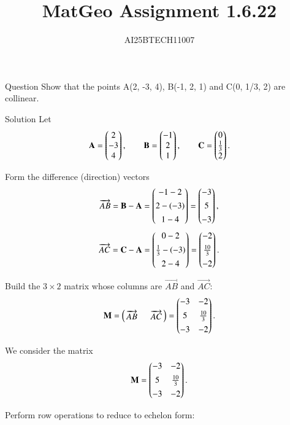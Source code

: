\documentclass{beamer}
\title 
{MatGeo Assignment 1.6.22}
\author
{AI25BTECH11007}
\begin{document}
\frame{\titlepage}
\begin{frame}{Question}
Show that the points A(2, -3, 4), B(-1, 2, 1) and C(0, 1/3, 2) are collinear.
\end{frame}
\begin{frame}{Solution}
Let
\begin{equation}
\mathbf{A}=\begin{pmatrix}2\\-3\\4\end{pmatrix},\qquad
\mathbf{B}=\begin{pmatrix}-1\\2\\1\end{pmatrix},\qquad
\mathbf{C}=\begin{pmatrix}0\\\tfrac{1}{3}\\2\end{pmatrix}.
\label{eq:points}
\end{equation}

Form the difference (direction) vectors
\begin{equation}
\overrightarrow{AB}=\mathbf{B}-\mathbf{A}=\begin{pmatrix}-1-2\\[4pt]2-(-3)\\[4pt]1-4\end{pmatrix}=\begin{pmatrix}-3\\[4pt]5\\[4pt]-3\end{pmatrix},
\label{eq:AB}
\end{equation}
\begin{equation}
\overrightarrow{AC}=\mathbf{C}-\mathbf{A}=\begin{pmatrix}0-2\\[4pt]\tfrac{1}{3}-(-3)\\[4pt]2-4\end{pmatrix}
=\begin{pmatrix}-2\\[4pt]\tfrac{10}{3}\\[4pt]-2\end{pmatrix}.
\label{eq:AC}
\end{equation}
\end{frame}
\begin{frame}
Build the $3\times 2$ matrix whose columns are $\overrightarrow{AB}$ and $\overrightarrow{AC}$:
\begin{equation}
\mathbf{M}=\begin{pmatrix}\,\overrightarrow{AB}\; & \; \overrightarrow{AC}\,\end{pmatrix}
=\begin{pmatrix} -3 & -2 \\[4pt] 5 & \tfrac{10}{3} \\[4pt] -3 & -2 \end{pmatrix}.
\label{eq:matrixM}
\end{equation}


We consider the matrix
\begin{equation}
\mathbf{M} = \begin{pmatrix} -3 & -2 \\[4pt] 5 & \tfrac{10}{3} \\[4pt] -3 & -2 \end{pmatrix}.
\label{eq:M}
\end{equation}

Perform row operations to reduce to echelon form:
\end{frame}
\end{document}

